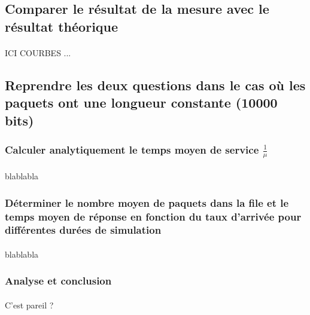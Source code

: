         \subsection{Comparer le résultat de la mesure avec le résultat théorique}
            \paragraph{}
ICI COURBES ...
%
        \subsection{Reprendre les deux questions dans le cas où les paquets ont une longueur constante (10000 bits)}
            \subsubsection{Calculer analytiquement le temps moyen de service $\frac{1}{\mu}$}
                \paragraph{}
blablabla
            \subsubsection{Déterminer le nombre moyen de paquets dans la file et le temps moyen de réponse en fonction du taux d'arrivée pour différentes durées de simulation}
                \paragraph{}
blablabla
            \subsubsection{Analyse et conclusion}
                \paragraph{}
C'est pareil ?
%
    \clearpage
